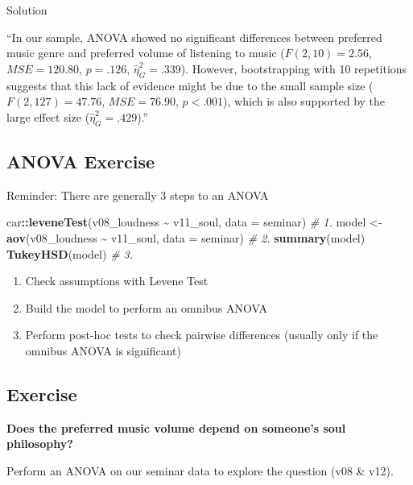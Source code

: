 \documentclass[
]{book}
\newenvironment{Shaded}{\begin{snugshade}}{\end{snugshade}}
\newcommand{\AttributeTok}[1]{\textcolor[rgb]{0.13,0.29,0.53}{#1}}
\newcommand{\CommentTok}[1]{\textcolor[rgb]{0.56,0.35,0.01}{\textit{#1}}}
\newcommand{\FunctionTok}[1]{\textcolor[rgb]{0.13,0.29,0.53}{\textbf{#1}}}
\newcommand{\NormalTok}[1]{#1}
\newcommand{\OtherTok}[1]{\textcolor[rgb]{0.56,0.35,0.01}{#1}}
\newcommand{\SpecialCharTok}[1]{\textcolor[rgb]{0.81,0.36,0.00}{\textbf{#1}}}
\providecommand{\tightlist}{%
  \setlength{\itemsep}{0pt}\setlength{\parskip}{0pt}}
\begin{document}
Solution

``In our sample, ANOVA showed no significant differences between preferred music genre and preferred volume of listening to music (\(F(2, 10) = 2.56\), \(\mathit{MSE} = 120.80\), \(p = .126\), \(\hat{\eta}^2_G = .339\)). However, bootstrapping with 10 repetitions suggests that this lack of evidence might be due to the small sample size (\(F(2, 127) = 47.76\), \(\mathit{MSE} = 76.90\), \(p < .001\)), which is also supported by the large effect size (\(\hat{\eta}^2_G = .429\)).''

\subsection{ANOVA Exercise}\label{anova-exercise}

Reminder: There are generally 3 steps to an ANOVA

\begin{Shaded}
\begin{Highlighting}[]
\NormalTok{car}\SpecialCharTok{::}\FunctionTok{leveneTest}\NormalTok{(v08\_loudness }\SpecialCharTok{\textasciitilde{}}\NormalTok{ v11\_soul, }\AttributeTok{data =}\NormalTok{ seminar) }\CommentTok{\# 1.}
\NormalTok{model }\OtherTok{\textless{}{-}} \FunctionTok{aov}\NormalTok{(v08\_loudness }\SpecialCharTok{\textasciitilde{}}\NormalTok{ v11\_soul, }\AttributeTok{data =}\NormalTok{ seminar) }\CommentTok{\# 2.}
\FunctionTok{summary}\NormalTok{(model)}
\FunctionTok{TukeyHSD}\NormalTok{(model) }\CommentTok{\# 3.}
\end{Highlighting}
\end{Shaded}

\begin{enumerate}
\def\labelenumi{\arabic{enumi}.}
\tightlist
\item
  Check assumptions with Levene Test
\item
  Build the model to perform an omnibus ANOVA
\item
  Perform post-hoc tests to check pairwise differences (usually only if the omnibus ANOVA is significant)
\end{enumerate}

\subsection{Exercise}\label{exercise-5}

\textbf{Does the preferred music volume depend on someone's soul philosophy?}

Perform an ANOVA on our seminar data to explore the question (v08 \& v12).
\end{document}
